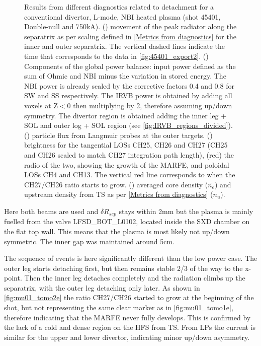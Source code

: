 \begin{figure}
     \caption{Results from different diagnostics related to detachment for a conventional divertor, L-mode, NBI heated plasma (shot 45401, Double-null and 750kA). () movement of the peak radiator along the separatrix as per scaling defined in \autoref{Metrics from diagnostics} for the inner and outer separatrix. The vertical dashed lines indicate the time that corresponds to the data in \autoref{fig:45401_export2}. () Components of the global power balance: input power defined as the sum of Ohmic and NBI minus the variation in stored energy. The NBI power is already scaled by the corrective factors 0.4 and 0.8 for SW and SS respectively. The IRVB power is obtained by adding all voxels at Z$<$0 then multiplying by 2, therefore assuming up/down symmetry. The divertor region is obtained adding the inner leg + SOL and outer log + SOL region (see \autoref{fig:IRVB_regions_divided}). () particle flux from Langmuir probes at the outer targets. () brightness for the tangential LOSs CH25, CH26 and CH27 (CH25 and CH26 scaled to match CH27 integration path length), (red) the radio of the two, showing the growth of the MARFE, and poloidal LOSs CH4 and CH13. The vertical red line corresponds to when the CH27/CH26 ratio starts to grow. () averaged core density ($\overline{n_e}$) and upstream density from TS as per \autoref{Metrics from diagnostics} ($n_u$).}
	\label{fig:mu01_tomo2}
\end{figure}


Here both beams are used and $\delta R_{sep}$ stays within 2mm but the plasma is mainly fuelled from the valve LFSD\_BOT\_L0102, located inside the SXD chamber on the flat top wall. This means that the plasma is most likely not up/down symmetric. The inner gap was maintained around 5cm.

The sequence of events is here significantly different than the low power case. The outer leg starts detaching first, but then remains stable 2/3 of the way to the x-point. Then the inner leg detaches completely and the radiation climbs up the separatrix, with the outer leg detaching only later. As shown in \autoref{fig:mu01_tomo2e} the ratio CH27/CH26 started to grow at the beginning of the shot, but not representing the same clear marker as in \autoref{fig:mu01_tomo1e}, therefore indicating that the MARFE never fully develops. This is confirmed by the lack of a cold and dense region on the HFS from TS. From LPs the current is similar for the upper and lower divertor, indicating minor up/down asymmetry.

